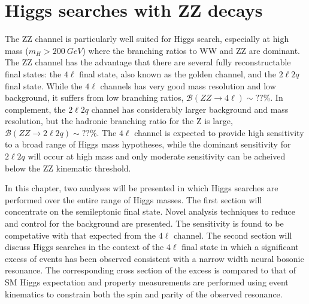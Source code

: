 \chapter{Higgs searches with ZZ decays}
\label{sec:HZZsearches}

The ZZ channel is particularly well suited for Higgs search, especially 
at high mass ($m_H>200~GeV$)
where the branching ratios to WW and ZZ are dominant.  The ZZ channel 
has the advantage that there are several fully reconstructable final
states: the $4\ell$ final state, also known as the golden channel, and
the $2\ell 2q$ final state.  While the $4\ell$ channels has very good 
mass resolution and low background, it suffers from low branching ratios,
$\mathscr{B}(ZZ\to 4\ell)\sim??$\%.  In complement, the $2\ell2q$
channel has considerably larger background and mass resolution, but the
hadronic branching ratio for the Z is large, 
$\mathscr{B}(ZZ\to 2\ell2q)\sim??\%$.  The $4\ell$ channel is expected to 
provide high sensitivity to a broad range of Higgs mass hypotheses, while
the dominant sensitivity for $2\ell 2q$ will occur at high mass and only 
moderate sensitivity can be acheived below the ZZ kinematic threshold.

In this chapter, two analyses will be presented in which Higgs searches
are performed over the entire range of Higgs masses.  The first 
section will concentrate on the semileptonic final state.  Novel analysis
techniques to reduce and control for the background are presented.  
The sensitivity is found to be competative with that expected from the 
$4\ell$ channel.  The second section will discuss Higgs searches in the 
context of the $4\ell$ final state in which a significant excess of 
events has been observed consistent with a narrow width neural bosonic
resonance.  The corresponding cross section of the excess
is compared to that of SM Higgs expectation and property
measurements are performed using event kinematics to constrain both the 
spin and parity of the observed resonance. 

